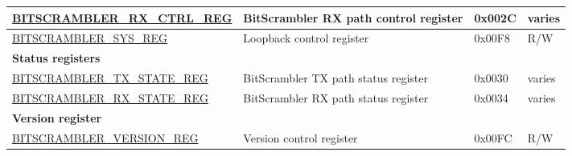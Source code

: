 \begin{longtable}{ | p{6.3cm} | p{7cm} | p{1.2cm} | p{1cm} | }
\hyperref[regdesc:BITSCRAMBLERRXCTRLREG]{BITSCRAMBLER\_RX\_CTRL\_REG} & BitScrambler RX path control register & 0x002C & varies \\ \hline
\hyperref[regdesc:BITSCRAMBLERSYSREG]{BITSCRAMBLER\_SYS\_REG} & Loopback control register & 0x00F8 & R/W \\ \hline
\multicolumn{4}{|l|}{\textbf{Status registers}} \\ \hline
\hyperref[regdesc:BITSCRAMBLERTXSTATEREG]{BITSCRAMBLER\_TX\_STATE\_REG} & BitScrambler TX path status register & 0x0030 & varies \\ \hline
\hyperref[regdesc:BITSCRAMBLERRXSTATEREG]{BITSCRAMBLER\_RX\_STATE\_REG} & BitScrambler RX path status register & 0x0034 & varies \\ \hline
\multicolumn{4}{|l|}{\textbf{Version register}} \\ \hline
\hyperref[regdesc:BITSCRAMBLERVERSIONREG]{BITSCRAMBLER\_VERSION\_REG} & Version control register & 0x00FC & R/W \\ \hline
\end{longtable}

